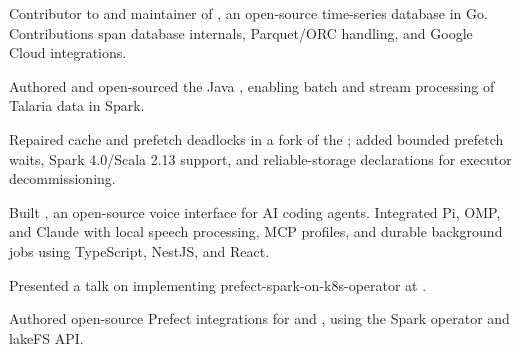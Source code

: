\begin{cvcontributions}
  \item {Contributor to and maintainer of , an open-source time-series database in Go. Contributions span database internals, Parquet/ORC handling, and Google Cloud integrations.}
  \item {Authored and open-sourced the Java , enabling batch and stream processing of Talaria data in Spark.}
  \item {Repaired cache and prefetch deadlocks in a fork of the ; added bounded prefetch waits, Spark 4.0/Scala 2.13 support, and reliable-storage declarations for executor decommissioning.}
  \item {Built , an open-source voice interface for AI coding agents. Integrated Pi, OMP, and Claude with local speech processing, MCP profiles, and durable background jobs using TypeScript, NestJS, and React.}
  \item {Presented a talk on implementing prefect-spark-on-k8s-operator at .}
  \item {Authored open-source Prefect integrations for \newline
  and , using the Spark operator and lakeFS API.}
\end{cvcontributions}
